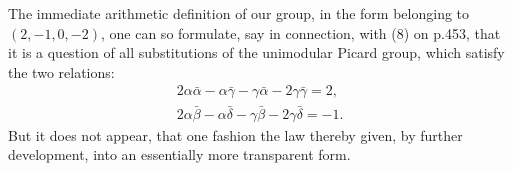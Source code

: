 The immediate arithmetic definition of our group, in the form belonging to $(2,-1,0,-2)$, one can so formulate, say in connection, with (8) on p.453, that it is a question of all substitutions of the unimodular Picard group, which satisfy the two relations:
\begin{align}
    2\alpha\bar{\alpha}-\alpha\bar{\gamma}-\gamma\bar{\alpha}-2\gamma\bar{\gamma}=2,\\
    2\alpha\bar{\beta}-\alpha\bar{\delta}-\gamma\bar{\beta}-2\gamma\bar{\delta}=-1.
\end{align}
But it does not appear, that one fashion the law thereby given, by further development, into an essentially more transparent form.